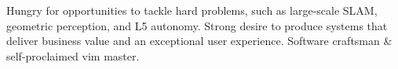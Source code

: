 

\begin{cvparagraph}

Hungry for opportunities to tackle hard problems, such as large-scale SLAM,
geometric perception, and L5 autonomy. Strong desire to produce systems that
deliver business value and an exceptional user experience. Software craftsman \&
self-proclaimed vim master.
\end{cvparagraph}
